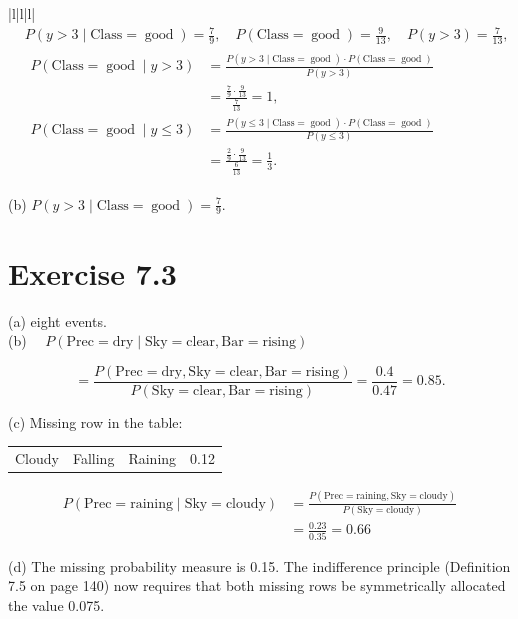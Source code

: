 \documentclass[10pt]{book}
\begin{document}
\begin{center}
\begin{tabular}{|l|l|l|}
$$
\begin{aligned}
& P(y>3 \mid \text{Class}=\operatorname{good})=\frac{7}{9}, \quad P(\text{Class}=\operatorname{good})=\frac{9}{13}, \quad P(y>3)=\frac{7}{13}, \\
& \begin{aligned}
P(\text{Class}=\operatorname{good} \mid y>3) & =\frac{P(y>3 \mid \text{Class}=\operatorname{good}) \cdot P(\text{Class}=\operatorname{good})}{P(y>3)} \\
& =\frac{\frac{7}{9} \cdot \frac{9}{13}}{\frac{7}{13}}=1, \\
P(\text{Class}=\operatorname{good} \mid y \leq 3) & =\frac{P(y \leq 3 \mid \text{Class}=\operatorname{good}) \cdot P(\text{Class}=\operatorname{good})}{P(y \leq 3)} \\
& =\frac{\frac{2}{9} \cdot \frac{9}{13}}{\frac{6}{13}}=\frac{1}{3}.
\end{aligned}
\end{aligned}
$$

(b) $P(y>3 \mid \text{Class}=\operatorname{good})=\frac{7}{9}$.

\section{Exercise 7.3}
(a) eight events.\\
(b) $\quad P(\text{Prec}=\mathrm{dry} \mid \text{Sky}=\text{clear}, \text{Bar}=\text{rising})$

$$
=\frac{P(\text{Prec}=\text{dry}, \text{Sky}=\text{clear}, \text{Bar}=\text{rising})}{P(\text{Sky}=\text{clear}, \text{Bar}=\text{rising})}=\frac{0.4}{0.47}=0.85.
$$

(c) Missing row in the table:\\[2pt]
\begin{center}
\begin{tabular}{llll}
Cloudy & Falling & Raining & 0.12
\end{tabular}
\end{center}

$$
\begin{aligned}
P(\text{Prec}=\text{raining} \mid \text{Sky}=\text{cloudy}) & =\frac{P(\text{Prec}=\text{raining}, \text{Sky}=\text{cloudy})}{P(\text{Sky}=\text{cloudy})} \\
& =\frac{0.23}{0.35}=0.66
\end{aligned}
$$

(d) The missing probability measure is 0.15. The indifference principle (Definition 7.5 on page 140) now requires that both missing rows be symmetrically allocated the value 0.075.


\end{tabular}
\end{center}
\end{document}
